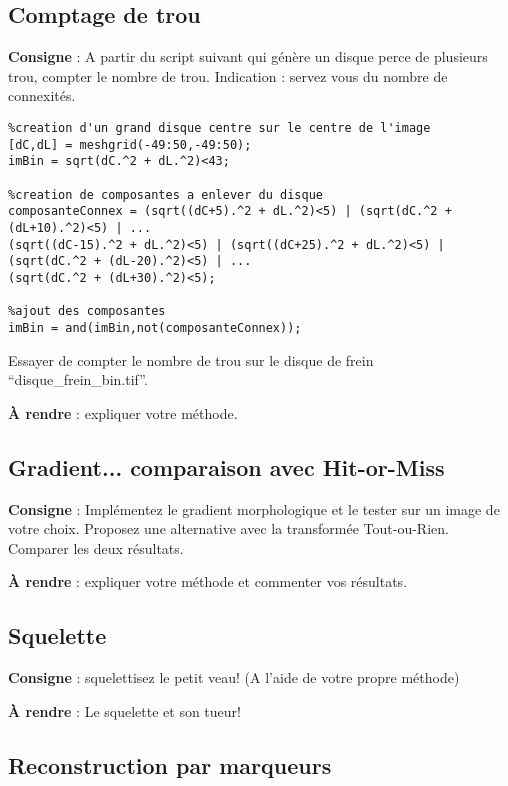 \documentclass[10pt,a4paper]{article}
\begin{document}
\subsection{Comptage de trou}
\textbf{Consigne} : A partir du script suivant qui g\'{e}n\`{e}re un disque perce de plusieurs trou, compter le nombre de trou. Indication : servez vous du nombre de connexit\'{e}s.
\begin{verbatim}
%creation d'un grand disque centre sur le centre de l'image
[dC,dL] = meshgrid(-49:50,-49:50);
imBin = sqrt(dC.^2 + dL.^2)<43;

%creation de composantes a enlever du disque
composanteConnex = (sqrt((dC+5).^2 + dL.^2)<5) | (sqrt(dC.^2 + (dL+10).^2)<5) | ...
(sqrt((dC-15).^2 + dL.^2)<5) | (sqrt((dC+25).^2 + dL.^2)<5) | (sqrt(dC.^2 + (dL-20).^2)<5) | ...
(sqrt(dC.^2 + (dL+30).^2)<5);

%ajout des composantes
imBin = and(imBin,not(composanteConnex));
\end{verbatim}
Essayer de compter le nombre de trou sur le disque de frein ``disque\_frein\_bin.tif''.

\noindent\textbf{\`{A} rendre} : expliquer votre m\'{e}thode.

\subsection{Gradient... comparaison avec Hit-or-Miss}
\textbf{Consigne} : Impl\'{e}mentez le gradient morphologique et le tester sur un image de votre choix. Proposez une alternative avec la transform\'{e}e Tout-ou-Rien. Comparer les deux r\'{e}sultats.

\noindent\textbf{\`{A} rendre} : expliquer votre m\'{e}thode et commenter vos r\'{e}sultats.

\subsection{Squelette}
\textbf{Consigne} : squelettisez le petit veau! (A l'aide de votre propre m\'{e}thode)

\noindent\textbf{\`{A} rendre} : Le squelette et son  tueur!





\subsection{Reconstruction par marqueurs}
\end{document}
